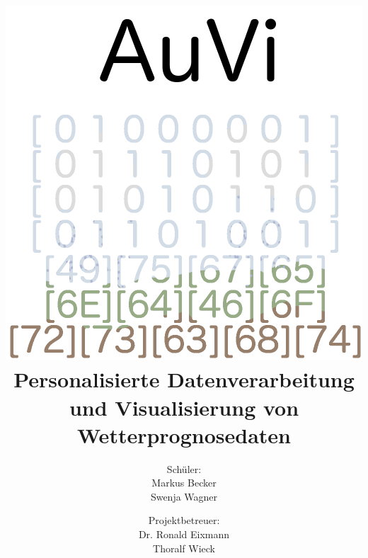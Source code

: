 \documentclass[a4paper,oneside,10pt,titlepage]{article}
\begin{document}
\linespread{.9}
\pagestyle{empty}
\title{\includegraphics[scale=.3]{imgs/auvi_white.png}\\Personalisierte Datenverarbeitung\\und Visualisierung von Wetterprognosedaten}
\author{Schüler:\\Markus Becker\\Swenja Wagner \and Projektbetreuer:\\Dr. Ronald Eixmann\\Thoralf Wieck}

\maketitle
\pagestyle{empty}
\tableofcontents
\thispagestyle{empty}
\pagestyle{plain}
\newpage
\end{document}
